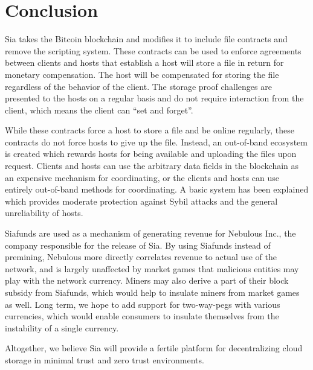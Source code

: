 \documentclass[twocolumn]{article}
\begin{document}
\section{Conclusion}
Sia takes the Bitcoin blockchain and modifies it to include file contracts and remove the scripting system.
These contracts can be used to enforce agreements between clients and hosts that establish a host will store a file in return for monetary compensation.
The host will be compensated for storing the file regardless of the behavior of the client.
The storage proof challenges are presented to the hosts on a regular basis and do not require interaction from the client, which means the client can ``set and forget''.

While these contracts force a host to store a file and be online regularly, these contracts do not force hosts to give up the file.
Instead, an out-of-band ecosystem is created which rewards hosts for being available and uploading the files upon request.
Clients and hosts can use the arbitrary data fields in the blockchain as an expensive mechanism for coordinating, or the clients and hosts can use entirely out-of-band methods for coordinating.
A basic system has been explained which provides moderate protection against Sybil attacks and the general unreliability of hosts.

Siafunds are used as a mechanism of generating revenue for Nebulous Inc., the company responsible for the release of Sia.
By using Siafunds instead of premining, Nebulous more directly correlates revenue to actual use of the network, and is largely unaffected by market games that malicious entities may play with the network currency.
Miners may also derive a part of their block subsidy from Siafunds, which would help to insulate miners from market games as well.
Long term, we hope to add support for two-way-pegs with various currencies, which would enable consumers to insulate themselves from the instability of a single currency.

Altogether, we believe Sia will provide a fertile platform for decentralizing cloud storage in minimal trust and zero trust environments.
\end{document}
